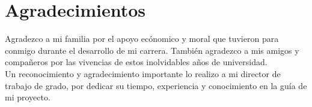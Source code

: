 \chapter*{Agradecimientos}

\noindent Agradezco a mi familia por el apoyo ecónomico y moral que tuvieron para conmigo
durante el desarrollo de mi carrera. También agradezco a mis amigos y
compañeros por las vivencias de estos inolvidables años de universidad.\\

Un reconocimiento y agradecimiento importante lo realizo a mi director de
trabajo de grado, por dedicar su tiempo, experiencia y conocimiento en la guía
de mi proyecto.
\newpage 